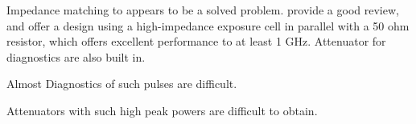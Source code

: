 \documentclass[paper.tex]{subfiles}
\begin{document}
Impedance matching to appears to be a solved problem. \cite{Microchamber2011} provide a good review, and offer a design using a high-impedance exposure cell in parallel with a 50 ohm resistor, which offers excellent performance to at least 1 GHz. Attenuator for diagnostics are also built in.

Almost   Diagnostics of such pulses are difficult.

 Attenuators with such high peak powers are difficult to obtain.

\cite{Characterization2012}
\end{document}
